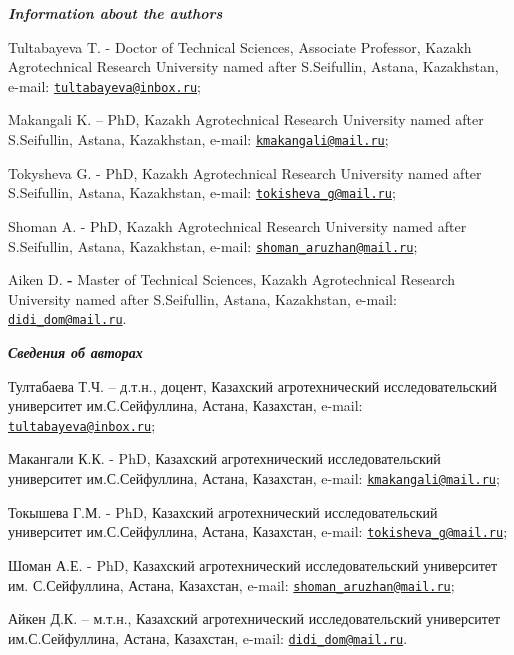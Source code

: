 \begin{authorinfo}
\hspace{1em}\emph{{\bfseries Information about the authors}}

Tultabayeva T. - Doctor of Technical Sciences, Associate Professor,
Kazakh Agrotechnical Research University named after S.Seifullin,
Astana, Kazakhstan, e-mail:
\href{mailto:tultabayeva@inbox.ru}{\nolinkurl{tultabayeva@inbox.ru}};

Makangali K. -- PhD, Kazakh Agrotechnical Research University named
after S.Seifullin, Astana, Kazakhstan, e-mail:\linebreak 
\href{mailto:kmakangali@mail.ru}{\nolinkurl{kmakangali@mail.ru}};

Tokysheva G. - PhD, Kazakh Agrotechnical Research University named after
S.Seifullin, Astana, Kazakhstan, e-mail:\linebreak 
\href{mailto:tokisheva_g@mail.ru}{\nolinkurl{tokisheva\_g@mail.ru}};

Shoman A. - PhD, Kazakh Agrotechnical Research University named after
S.Seifullin, Astana, Kazakhstan, \linebreak e-mail:
\href{mailto:shoman_aruzhan@mail.ru}{\nolinkurl{shoman\_aruzhan@mail.ru}};

Aiken D. {\bfseries -} Master of Technical Sciences, Kazakh Agrotechnical
Research University named after S.Seifullin, Astana, Kazakhstan, e-mail:
\href{mailto:didi_dom@mail.ru}{\nolinkurl{didi\_dom@mail.ru}}.

\hspace{1em}\emph{{\bfseries Сведения об авторах}}

Тултабаева Т.Ч. -- д.т.н., доцент, Казахский агротехнический
исследовательский университет им.С.Сейфуллина, Астана, Казахстан,
e-mail:
\href{mailto:tultabayeva@inbox.ru}{\nolinkurl{tultabayeva@inbox.ru}};

Макангали К.К. - PhD, Казахский агротехнический исследовательский
университет им.С.Сейфуллина, Астана, Казахстан, e-mail:
\href{mailto:kmakangali@mail.ru}{\nolinkurl{kmakangali@mail.ru}};

Токышева Г.М. - PhD, Казахский агротехнический исследовательский
университет им.С.Сейфуллина, Астана, Казахстан, e-mail:
\href{mailto:tokisheva_g@mail.ru}{\nolinkurl{tokisheva\_g@mail.ru}};

Шоман А.Е. - PhD, Казахский агротехнический исследовательский
университет им. С.Сейфуллина, Астана, Казахстан, e-mail:
\href{mailto:shoman_aruzhan@mail.ru}{\nolinkurl{shoman\_aruzhan@mail.ru}};

Айкен Д.К. -- м.т.н., Казахский агротехнический исследовательский
университет им.С.Сейфуллина, Астана, Казахстан, e-mail:
\href{mailto:didi_dom@mail.ru}{\nolinkurl{didi\_dom@mail.ru}}.
\end{authorinfo}
